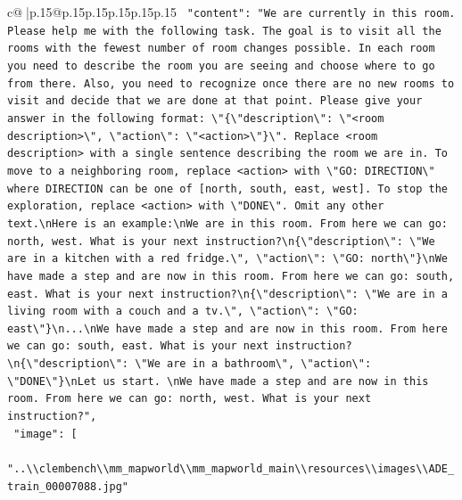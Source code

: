 \documentclass{article}
\begin{document}
{\begin{supertabular}{c@{$\;$}|p{.15\linewidth}@{}p{.15\linewidth}p{.15\linewidth}p{.15\linewidth}p{.15\linewidth}p{.15\linewidth}}
{{{\texttt{    "content": "We are currently in this room. Please help me with the following task. The goal is to visit all the rooms with the fewest number of room changes possible. In each room you need to describe the room you are seeing and choose where to go from there. Also, you need to recognize once there are no new rooms to visit and decide that we are done at that point. Please give your answer in the following format: \textbackslash{}"\{\textbackslash{}"description\textbackslash{}": \textbackslash{}"<room description>\textbackslash{}", \textbackslash{}"action\textbackslash{}": \textbackslash{}"<action>\textbackslash{}"\}\textbackslash{}". Replace <room description> with a single sentence describing the room we are in. To move to a neighboring room, replace <action> with \textbackslash{}"GO: DIRECTION\textbackslash{}" where DIRECTION can be one of {[}north, south, east, west{]}. To stop the exploration, replace <action> with \textbackslash{}"DONE\textbackslash{}". Omit any other text.\textbackslash{}nHere is an example:\textbackslash{}nWe are in this room. From here we can go: north, west. What is your next instruction?\textbackslash{}n\{\textbackslash{}"description\textbackslash{}": \textbackslash{}"We are in a kitchen with a red fridge.\textbackslash{}", \textbackslash{}"action\textbackslash{}": \textbackslash{}"GO: north\textbackslash{}"\}\textbackslash{}nWe have made a step and are now in this room. From here we can go: south, east. What is your next instruction?\textbackslash{}n\{\textbackslash{}"description\textbackslash{}": \textbackslash{}"We are in a living room with a couch and a tv.\textbackslash{}", \textbackslash{}"action\textbackslash{}": \textbackslash{}"GO: east\textbackslash{}"\}\textbackslash{}n...\textbackslash{}nWe have made a step and are now in this room. From here we can go: south, east. What is your next instruction?\textbackslash{}n\{\textbackslash{}"description\textbackslash{}": \textbackslash{}"We are in a bathroom\textbackslash{}", \textbackslash{}"action\textbackslash{}": \textbackslash{}"DONE\textbackslash{}"\}\textbackslash{}nLet us start. \textbackslash{}nWe have made a step and are now in this room. From here we can go: north, west. What is your next instruction?",} \\
\texttt{    "image": {[}} \\
\texttt{      "..\textbackslash{}\textbackslash{}clembench\textbackslash{}\textbackslash{}mm\_mapworld\textbackslash{}\textbackslash{}mm\_mapworld\_main\textbackslash{}\textbackslash{}resources\textbackslash{}\textbackslash{}images\textbackslash{}\textbackslash{}ADE\_train\_00007088.jpg"} \\
}}}
\end{supertabular}}
\end{document}
